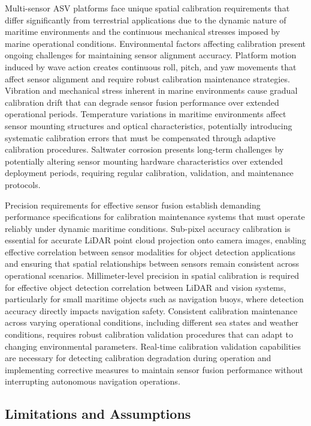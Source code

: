 \documentclass{erauthesis}
\begin{document}
Multi-sensor \ac{ASV} platforms face unique spatial calibration requirements that differ significantly from terrestrial applications due to the dynamic nature of maritime environments and the continuous mechanical stresses imposed by marine operational conditions.
Environmental factors affecting calibration present ongoing challenges for maintaining sensor alignment accuracy. Platform motion induced by wave action creates continuous roll, pitch, and yaw movements that affect sensor alignment and require robust calibration maintenance strategies. Vibration and mechanical stress inherent in marine environments cause gradual calibration drift that can degrade sensor fusion performance over extended operational periods. Temperature variations in maritime environments affect sensor mounting structures and optical characteristics, potentially introducing systematic calibration errors that must be compensated through adaptive calibration procedures. Saltwater corrosion presents long-term challenges by potentially altering sensor mounting hardware characteristics over extended deployment periods, requiring regular calibration, validation, and maintenance protocols.

Precision requirements for effective sensor fusion establish demanding performance specifications for calibration maintenance systems that must operate reliably under dynamic maritime conditions. Sub-pixel accuracy calibration is essential for accurate \ac{LiDAR} point cloud projection onto camera images, enabling effective correlation between sensor modalities for object detection applications and ensuring that spatial relationships between sensors remain consistent across operational scenarios. Millimeter-level precision in spatial calibration is required for effective object detection correlation between \ac{LiDAR} and vision systems, particularly for small maritime objects such as navigation buoys, where detection accuracy directly impacts navigation safety. Consistent calibration maintenance across varying operational conditions, including different sea states and weather conditions, requires robust calibration validation procedures that can adapt to changing environmental parameters. Real-time calibration validation capabilities are necessary for detecting calibration degradation during operation and implementing corrective measures to maintain sensor fusion performance without interrupting autonomous navigation operations.

\subsection{Limitations and Assumptions}
\end{document}
